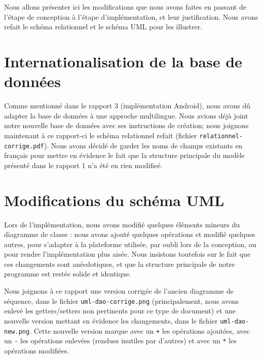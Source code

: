 \documentclass[a4paper,10pt]{article}
\begin{document}

Nous allons présenter ici les modifications que nous avons faites en passant de l'étape de conception à l'étape d'implémentation, et leur justification. Nous avons refait le schéma relationnel et le schéma UML pour les illustrer.

\section{Internationalisation de la base de données}

Comme mentionné dans le rapport 3 (implémentation Android), nous avons dû adapter la base de données à une approche multilingue.
Nous avions déjà joint notre nouvelle base de données avec ses instructions de création; nous joignons maintenant à ce rapport-ci le schéma relationnel refait (fichier \texttt{relationnel-corrige.pdf}). Nous avons décidé de garder les noms de champs existants en français pour mettre en évidence le fait que la structure principale du modèle présenté dans le rapport 1 n'a été en rien modifieé.

\section{Modifications du schéma UML}

Lors de l'implémentation, nous avons modifié quelques éléments mineurs du diagramme de classe : nous avons ajouté quelques opérations et modifié quelques autres, pour s'adapter à la plateforme utilisée, par oubli lors de la conception, ou pour rendre l'implémentation plus aisée. Nous insistons toutefois sur le fait que ces changements sont anécdotiques, et que la structure principale de notre programme est restée solide et identique.

Nous joignons à ce rapport une version corrigée de l'ancien diagramme de séquence, dans le fichier \texttt{uml-dao-corrige.png} (principalement, nous avons enlevé les getters/setters non pertinents pour ce type de document) et une nouvelle version mettant en évidence les changements, dans le fichier \texttt{uml-dao-new.png}. Cette nouvelle version marque avec un \texttt{+} les opérations ajoutées, avec un \texttt{-} les opérations enlevées (rendues inutiles par d'autres) et avec un \texttt{*} les opérations modifiées.
\end{document}

